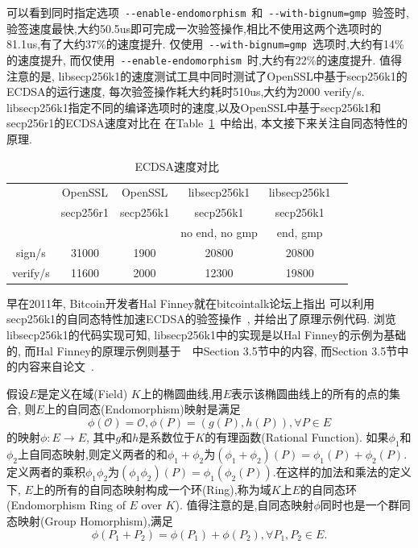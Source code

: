 \documentclass{article}
\newcommand{\code}[1]{\lstinline!#1!}
\begin{document}
可以看到同时指定选项~\code{--enable-endomorphism}~和~\code{--with-bignum=gmp}~验签时,
验签速度最快,大约50.5us即可完成一次验签操作,相比不使用这两个选项时的81.1us,有了大约37\%的速度提升.
仅使用~\code{--with-bignum=gmp}~选项时,大约有14\%的速度提升,
而仅使用~\code{--enable-endomorphism}~时,大约有22\%的速度提升.
值得注意的是, libsecp256k1的速度测试工具中同时测试了OpenSSL中基于secp256k1的ECDSA的运行速度,
每次验签操作耗大约耗时510us,大约为2000 verify/s.
libsecp256k1指定不同的编译选项时的速度,以及OpenSSL中基于secp256k1和secp256r1的ECDSA速度对比在
在Table~\ref{tbl-ecdsa-bench}~中给出, 本文接下来关注自同态特性的原理.

\begin{table}[h]
\centering
\caption{ECDSA速度对比}\label{tbl-ecdsa-bench}
\begin{tabular}{|c|c|c|c|c|c|}
\hline
\small
         & OpenSSL & OpenSSL & libsecp256k1  & libsecp256k1 \\
         & secp256r1 & secp256k1 & secp256k1        & secp256k1 \\
         &                 &                 &   no end, no gmp & end, gmp \\\hline
 sign/s  & 31000  & 1900 & 20800 & 20800 \\\hline
 verify/s & 11600 & 2000 & 12300 & 19800 \\\hline
\end{tabular}
\end{table}

早在2011年, Bitcoin开发者Hal Finney就在bitcointalk论坛上指出
可以利用secp256k1的自同态特性加速ECDSA的验签操作~\cite{halfinney}, 并给出了原理示例代码.
浏览libsecp256k1的代码实现可知, libsecp256k1中的实现是以Hal Finney的示例为基础的,
而Hal Finney的原理示例则基于~\cite{guidetoecc}~中Section 3.5节中的内容,
而Section 3.5节中的内容来自论文~\cite{glv01}.

假设$E$是定义在域(Field) $K$上的椭圆曲线,用$E$表示该椭圆曲线上的所有的点的集合,
则$E$上的自同态(Endomorphism)映射是满足
$$\phi(\mathcal{O}) = \mathcal{O}, \phi(P) = (g(P), h(P)), \forall P \in E$$
的映射$\phi: E \rightarrow E$, 其中$g$和$h$是系数位于$K$的有理函数(Rational Function).
如果$\phi_1$和$\phi_2$上自同态映射,则定义两者的和$\phi_1+\phi_2$为$(\phi_1+\phi_2)(P) = \phi_1(P) + \phi_2(P)$.
定义两者的乘积$\phi_1\phi_2$为$(\phi_1\phi_2)(P)=\phi_1(\phi_2(P))$.在这样的加法和乘法的定义下,
$E$上的所有的自同态映射构成一个环(Ring),称为域$K$上$E$的自同态环(Endomorphism Ring of $E$ over $K$).
值得注意的是,自同态映射$\phi$同时也是一个群同态映射(Group Homorphism),满足
$$\phi(P_1 + P_2) = \phi(P_1) + \phi(P_2), \forall P_1, P_2 \in E.$$
\end{document}
